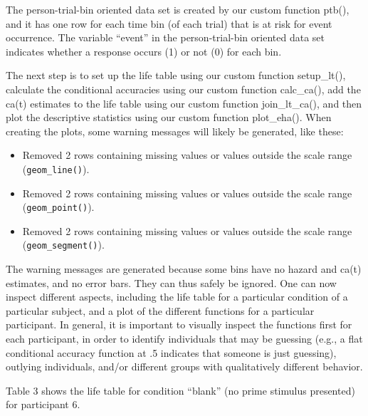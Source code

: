 \documentclass[
  man, donotrepeattitle,floatsintext]{apa6}
\providecommand{\tightlist}{%
  \setlength{\itemsep}{0pt}\setlength{\parskip}{0pt}}
\begin{document}
The person-trial-bin oriented data set is created by our custom function ptb(), and it has one row for each time bin (of each trial) that is at risk for event occurrence. The variable ``event'' in the person-trial-bin oriented data set indicates whether a response occurs (1) or not (0) for each bin.

The next step is to set up the life table using our custom function setup\_lt(), calculate the conditional accuracies using our custom function calc\_ca(), add the ca(t) estimates to the life table using our custom function join\_lt\_ca(), and then plot the descriptive statistics using our custom function plot\_eha(). When creating the plots, some warning messages will likely be generated, like these:

\begin{itemize}
\tightlist
\item
  Removed 2 rows containing missing values or values outside the scale range (\texttt{geom\_line()}).
\item
  Removed 2 rows containing missing values or values outside the scale range (\texttt{geom\_point()}).
\item
  Removed 2 rows containing missing values or values outside the scale range (\texttt{geom\_segment()}).
\end{itemize}

The warning messages are generated because some bins have no hazard and ca(t) estimates, and no error bars. They can thus safely be ignored.
One can now inspect different aspects, including the life table for a particular condition of a particular subject, and a plot of the different functions for a particular participant.
In general, it is important to visually inspect the functions first for each participant, in order to identify individuals that may be guessing (e.g., a flat conditional accuracy function at .5 indicates that someone is just guessing), outlying individuals, and/or different groups with qualitatively different behavior.

Table 3 shows the life table for condition ``blank'' (no prime stimulus presented) for participant 6.
\end{document}
